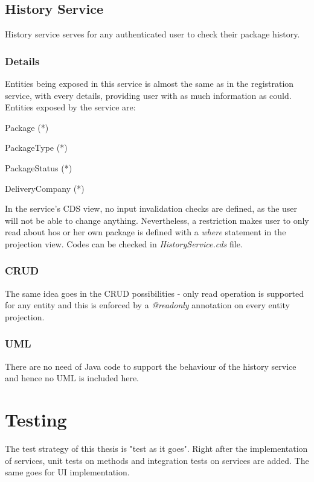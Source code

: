 \subsection{History Service}
History service serves for any authenticated user to check their package history.

\subsubsection{Details}

Entities being exposed in this service is almost the same as in the registration service, with every details, providing user with as much information as could. Entities exposed by the service are:
\begin{compactenum}
	\item Package (*)
    \item PackageType (*)
    \item PackageStatus (*)
    \item DeliveryCompany (*)
\end{compactenum}

\bigskip
In the service's CDS view, no input invalidation checks are defined, as the user will not be able to change anything. Nevertheless, a restriction makes user to only read about hos or her own package is defined with a \textit{where} statement in the projection view. Codes can be checked in \textit{HistoryService.cds} file.

\subsubsection{CRUD}
The same idea goes in the CRUD possibilities - only read operation is supported for any entity and this is enforced by a \textit{@readonly} annotation on every entity projection.

\subsubsection{UML}

There are no need of Java code to support the behaviour of the history service and hence no UML is included here.


\section{Testing}
The test strategy of this thesis is "test as it goes". Right after the implementation of services, unit tests on methods and integration tests on services are added. The same goes for UI implementation.

